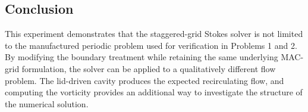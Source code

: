 \documentclass[12pt]{article}
\begin{document}
\subsection*{Conclusion}

This experiment demonstrates that the staggered-grid Stokes solver is not
limited to the manufactured periodic problem used for verification in
Problems 1 and 2. By modifying the boundary treatment while retaining the
same underlying MAC-grid formulation, the solver can be applied to a
qualitatively different flow problem. The lid-driven cavity produces the
expected recirculating flow, and computing the vorticity provides an
additional way to investigate the structure of the numerical solution.
\end{document}
